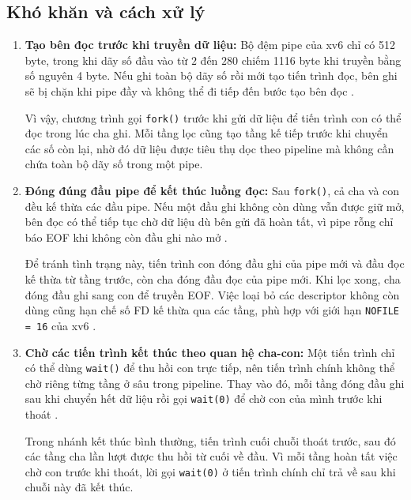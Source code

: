 \subsection{Khó khăn và cách xử lý}
\begin{enumerate}
    \item \textbf{Tạo bên đọc trước khi truyền dữ liệu:}
    Bộ đệm pipe của xv6 chỉ có 512 byte, trong khi dãy số đầu vào
    từ $2$ đến $280$ chiếm 1116 byte khi truyền bằng số nguyên 4 byte.
    Nếu ghi toàn bộ dãy số rồi mới tạo tiến trình đọc, bên ghi sẽ bị
    chặn khi pipe đầy và không thể đi tiếp đến bước tạo bên đọc
    \cite{xv6pipe}.

    Vì vậy, chương trình gọi \texttt{fork()} trước khi gửi dữ liệu
    để tiến trình con có thể đọc trong lúc cha ghi. Mỗi tầng lọc cũng
    tạo tầng kế tiếp trước khi chuyển các số còn lại, nhờ đó dữ liệu
    được tiêu thụ dọc theo pipeline mà không cần chứa toàn bộ dãy số
    trong một pipe.

    \item \textbf{Đóng đúng đầu pipe để kết thúc luồng đọc:}
    Sau \texttt{fork()}, cả cha và con đều kế thừa các đầu pipe.
    Nếu một đầu ghi không còn dùng vẫn được giữ mở, bên đọc có thể
    tiếp tục chờ dữ liệu dù bên gửi đã hoàn tất, vì pipe rỗng chỉ báo
    EOF khi không còn đầu ghi nào mở \cite{xv6pipe,xv6book}.

    Để tránh tình trạng này, tiến trình con đóng đầu ghi của pipe mới
    và đầu đọc kế thừa từ tầng trước, còn cha đóng đầu đọc của pipe
    mới. Khi lọc xong, cha đóng đầu ghi sang con để truyền EOF. Việc
    loại bỏ các descriptor không còn dùng cũng hạn chế số FD kế thừa
    qua các tầng, phù hợp với giới hạn \texttt{NOFILE = 16} của xv6
    \cite{xv6param}.

    \item \textbf{Chờ các tiến trình kết thúc theo quan hệ cha-con:}
    Một tiến trình chỉ có thể dùng \texttt{wait()} để thu hồi con
    trực tiếp, nên tiến trình chính không thể chờ riêng từng tầng ở
    sâu trong pipeline. Thay vào đó, mỗi tầng đóng đầu ghi sau khi
    chuyển hết dữ liệu rồi gọi \texttt{wait(0)} để chờ con của mình
    trước khi thoát \cite{xv6proc}.

    Trong nhánh kết thúc bình thường, tiến trình cuối chuỗi thoát
    trước, sau đó các tầng cha lần lượt được thu hồi từ cuối về đầu.
    Vì mỗi tầng hoàn tất việc chờ con trước khi thoát, lời gọi
    \texttt{wait(0)} ở tiến trình chính chỉ trả về sau khi chuỗi này
    đã kết thúc.
\end{enumerate}

